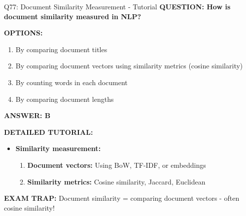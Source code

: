 \documentclass[8pt]{beamer}
\begin{document}
	\begin{frame}{Q77: Document Similarity Measurement - Tutorial}
		\fontsize{6.5}{7.5}\selectfont
		\textbf{QUESTION: How is document similarity measured in NLP?}
		
		\vspace{0.1cm}
		\textbf{OPTIONS:}
		\begin{enumerate}
			\item By comparing document titles
			\item By comparing document vectors using similarity metrics (cosine similarity)
			\item By counting words in each document
			\item By comparing document lengths
		\end{enumerate}
		
		\vspace{0.1cm}
		\textcolor{myblue}{\textbf{ANSWER: B}}
		
		\vspace{0.1cm}
		\textbf{DETAILED TUTORIAL:}
		\begin{itemize}
			\item \textbf{Similarity measurement:}
			\begin{enumerate}
				\item \textbf{Document vectors:} Using BoW, TF-IDF, or embeddings
				\item \textbf{Similarity metrics:} Cosine similarity, Jaccard, Euclidean
			\end{enumerate}
		\end{itemize}
		
		\textcolor{myred}{\textbf{EXAM TRAP:}} Document similarity = \textcolor{myblue}{comparing document vectors} - often cosine similarity!
	\end{frame}
	
\end{document}

